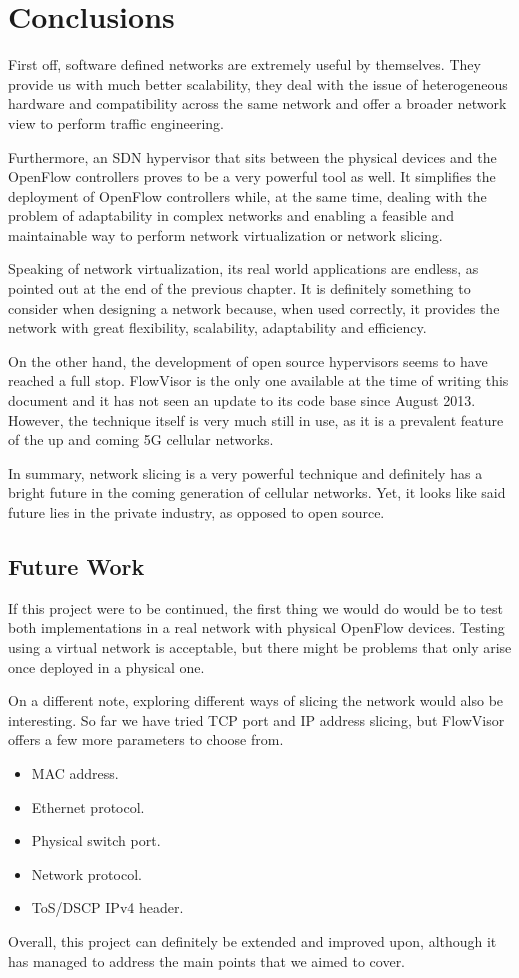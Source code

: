 \chapter{Conclusions}
First off, software defined networks are extremely useful by themselves. They provide us with much better scalability, they deal with the issue of heterogeneous hardware and compatibility across the same network and offer a broader network view to perform traffic engineering. 

Furthermore, an SDN hypervisor that sits between the physical devices and the OpenFlow controllers proves to be a very powerful tool as well. It simplifies the deployment of OpenFlow controllers while, at the same time, dealing with the problem of adaptability in complex networks and enabling a feasible and maintainable way to perform network virtualization or network slicing.

Speaking of network virtualization, its real world applications are endless, as pointed out at the end of the previous chapter. It is definitely something to consider when designing a network because, when used correctly, it provides the network with great flexibility, scalability, adaptability and efficiency.

On the other hand, the development of open source hypervisors seems to have reached a full stop. FlowVisor is the only one available at the time of writing this document and it has not seen an update to its code base since August 2013. However, the technique itself is very much still in use, as it is a prevalent feature of the up and coming 5G cellular networks.   

In summary, network slicing is a very powerful technique and definitely has a bright future in the coming generation of cellular networks. Yet, it looks like said future lies in the private industry, as opposed to open source.

\section{Future Work}
If this project were to be continued, the first thing we would do would be to test both implementations in a real network with physical OpenFlow devices. Testing using a virtual network is acceptable, but there might be problems that only arise once deployed in a physical one.

On a different note, exploring different ways of slicing the network would also be interesting. So far we have tried TCP port and IP address slicing, but FlowVisor offers a few more parameters to choose from.
\begin{itemize}
    \item MAC address.
    \item Ethernet protocol.
    \item Physical switch port.
    \item Network protocol.
    \item ToS/DSCP IPv4 header.
\end{itemize}

Overall, this project can definitely be extended and improved upon, although it has managed to address the main points that we aimed to cover.
